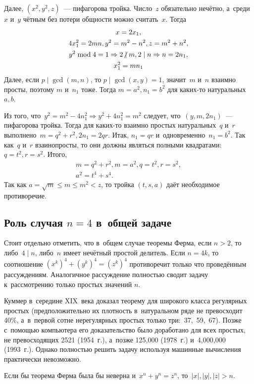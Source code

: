 \documentclass{article}
\begin{document}
Далее, $(x^2,y^2,z)$~--- пифагорова тройка. Число~$z$ обязательно нечётно,
а~среди~$x$ и~$y$ чётным без потери общности можно считать~$x$. Тогда
\begin{gather*}
x = 2x_1,\\
4x_1^2 = 2mn, y^2 = m^2 - n^2, z = m^2 + n^2,\\
y^2 \bmod 4 = 1 \Rightarrow 2 \ndiv m, 2 \mid n \Rightarrow n = 2n_1,\\
x_1^2=m n_1
\end{gather*}
Далее, если $p \mid \gcd(m,n)$, то $p \mid \gcd(x,y) = 1$, значит~$m$ и~$n$
взаимно просты, поэтому $m$ и~$n_1$ тоже. Тогда $m = a^2, n_1 = b^2$ для
каких-то натуральных $a, b$.

Из того, что~$y^2 = m^2 - 4n_1^2 \Rightarrow y^2 + 4n_1^2 = m^2$ следует,
что~$(y, m, 2n_1)$~--- пифагорова тройка. Тогда для каких-то взаимно простых
натуральных~$q$ и~$r$ выполнено~$m = q^2 + r^2, 2n_1=2qr$. Итак, $n_1 = qr$
и~одновременно~$n_1 = b^2$. Так как~$q$ и~$r$ взаинопросты, то они должны
являться полными квадратами: $q = t^2, r = s^2$. Итого,
\begin{gather*}
  m = q^2 + r^2, m = a^2, q = t^2, r = s^2,\\
  a^2 = t^4 + s^4.
\end{gather*}
Так как $a = \sqrt{m} \le m \le m^2 < z$, то тройка $(t, s, a)$ даёт
необходимое противоречие.

\subsection{Роль случая $n = 4$ в~общей задаче}

Стоит отдельно отметить, что в~общем случае теоремы Ферма, если $n > 2$, то
либо~$4 \mid n$, либо~$n$ имеет нечётный простой делитель. Если $n = 4k$,
то соотношение $(x^k)^4 + (y^k)^4 = (z^k)^4$ противоречит только что проведённым
рассуждениям. Аналогичное рассуждение полностью сводит задачу к~рассмотрению
только простых значений $n$.

Куммер в~середине XIX~века доказал теорему для широкого класса регулярных
простых (предположительно их плотность в~натуральном ряде не превосходит
40\%, а~в~первой сотне нерегулярных простых только три:~37,~59,~67). Позже
с~помощью компьютера его доказательство было доработано для всех простых, не
превосходящих 2521 (1954~г.), а~позже 125,000 (1978~г.) и~4,000,000 (1993~г.).
Однако полностью решить задачу используя машинные вычисления практически
невозможно.

\begin{exercise}
  Если бы теорема Ферма была бы неверна и~$x^n + y^n = z^n$, то~$|x|,|y|,|z|>n$.
\end{exercise}
\end{document}
